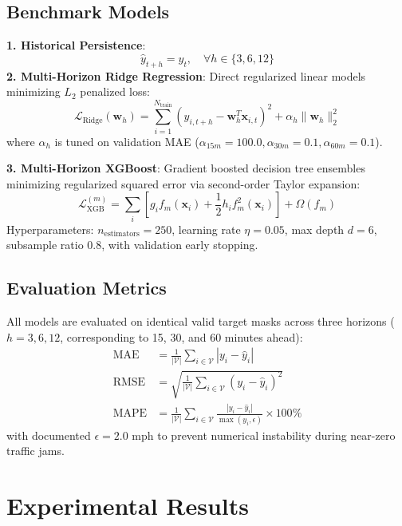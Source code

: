 \documentclass[conference]{IEEEtran}
\begin{document}
\subsection{Benchmark Models}
\textbf{1. Historical Persistence}:
\begin{equation}
    \hat{y}_{t+h} = y_t, \quad \forall h \in \{3, 6, 12\}
\end{equation}
\textbf{2. Multi-Horizon Ridge Regression}: Direct regularized linear models minimizing $L_2$ penalized loss:
\begin{equation}
    \mathcal{L}_{\text{Ridge}}(\mathbf{w}_h) = \sum_{i=1}^{N_{\text{train}}} (y_{i,t+h} - \mathbf{w}_h^T \mathbf{x}_{i,t})^2 + \alpha_h \|\mathbf{w}_h\|_2^2
\end{equation}
where $\alpha_h$ is tuned on validation MAE ($\alpha_{15m}=100.0, \alpha_{30m}=0.1, \alpha_{60m}=0.1$).

\textbf{3. Multi-Horizon XGBoost}: Gradient boosted decision tree ensembles minimizing regularized squared error via second-order Taylor expansion:
\begin{equation}
    \mathcal{L}_{\text{XGB}}^{(m)} = \sum_{i} \left[ g_i f_m(\mathbf{x}_i) + \frac{1}{2} h_i f_m^2(\mathbf{x}_i) \right] + \Omega(f_m)
\end{equation}
Hyperparameters: $n_{\text{estimators}}=250$, learning rate $\eta=0.05$, max depth $d=6$, subsample ratio $0.8$, with validation early stopping.

\subsection{Evaluation Metrics}
All models are evaluated on identical valid target masks across three horizons ($h=3, 6, 12$, corresponding to 15, 30, and 60 minutes ahead):
\begin{align}
    \text{MAE} &= \frac{1}{|\mathcal{V}|} \sum_{i \in \mathcal{V}} |y_i - \hat{y}_i| \\
    \text{RMSE} &= \sqrt{\frac{1}{|\mathcal{V}|} \sum_{i \in \mathcal{V}} (y_i - \hat{y}_i)^2} \\
    \text{MAPE} &= \frac{1}{|\mathcal{V}|} \sum_{i \in \mathcal{V}} \frac{|y_i - \hat{y}_i|}{\max(y_i, \epsilon)} \times 100\%
\end{align}
with documented $\epsilon = 2.0$ mph to prevent numerical instability during near-zero traffic jams.

\section{Experimental Results}
\end{document}
